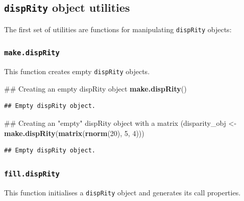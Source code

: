 \documentclass[]{book}
\newenvironment{Shaded}{\begin{snugshade}}{\end{snugshade}}
\newcommand{\KeywordTok}[1]{\textcolor[rgb]{0.13,0.29,0.53}{\textbf{#1}}}
\newcommand{\DecValTok}[1]{\textcolor[rgb]{0.00,0.00,0.81}{#1}}
\newcommand{\StringTok}[1]{\textcolor[rgb]{0.31,0.60,0.02}{#1}}
\newcommand{\OperatorTok}[1]{\textcolor[rgb]{0.81,0.36,0.00}{\textbf{#1}}}
\newcommand{\NormalTok}[1]{#1}
\theoremstyle{definition}
\theoremstyle{definition}
\theoremstyle{remark}
\begin{document}
\subsection{\texorpdfstring{\texttt{dispRity} object utilities
}{dispRity object utilities }}\label{disprity-object-utilities}

The first set of utilities are functions for manipulating
\texttt{dispRity} objects:

\subsubsection{\texorpdfstring{\texttt{make.dispRity}}{make.dispRity}}\label{make.disprity}

This function creates empty \texttt{dispRity} objects.

\begin{Shaded}
\begin{Highlighting}[]
\NormalTok{## Creating an empty dispRity object}
\KeywordTok{make.dispRity}\NormalTok{()}
\end{Highlighting}
\end{Shaded}

\begin{verbatim}
## Empty dispRity object.
\end{verbatim}

\begin{Shaded}
\begin{Highlighting}[]
\NormalTok{## Creating an "empty" dispRity object with a matrix}
\NormalTok{(disparity_obj <-}\StringTok{ }\KeywordTok{make.dispRity}\NormalTok{(}\KeywordTok{matrix}\NormalTok{(}\KeywordTok{rnorm}\NormalTok{(}\DecValTok{20}\NormalTok{), }\DecValTok{5}\NormalTok{, }\DecValTok{4}\NormalTok{)))}
\end{Highlighting}
\end{Shaded}

\begin{verbatim}
## Empty dispRity object.
\end{verbatim}

\subsubsection{\texorpdfstring{\texttt{fill.dispRity}}{fill.dispRity}}\label{fill.disprity}

This function initialises a \texttt{dispRity} object and generates its
call properties.

\begin{Shaded}
\end{Shaded}
\end{document}
